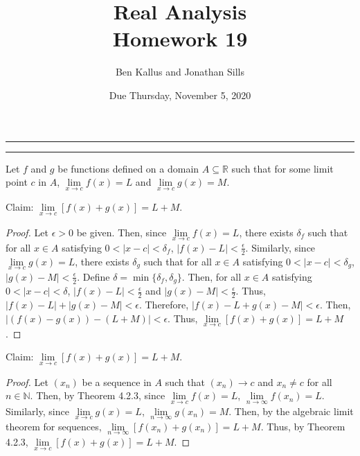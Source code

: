 \documentclass[12pt]{article}
\title{Real Analysis \\ Homework 19}
\author{Ben Kallus and Jonathan Sills}
\date{Due Thursday, November 5, 2020}
\begin{document}
\pagecolor{black}
\color{white}
\maketitle

\hrule
\bigskip


\bigskip
\hrule
\bigskip

 Let $f$ and $g$ be functions defined on a domain $A \subseteq \mathbb R$ such that for some limit point $c$ in $A$, $\lim\limits_{x\to c}f(x)=L$ and $\lim\limits_{x\to c}g(x) = M$.

\medskip
{} Claim: $\lim\limits_{x \to c}[f(x) + g(x)] = L + M$.
\begin{proof}
    Let $\epsilon > 0$ be given.
    Then, since $\lim\limits_{x\to c}f(x)=L$, there exists $\delta_f$ such that for all $x \in A$ satisfying $0 < |x - c| < \delta_f$, $|f(x) - L| < \frac\epsilon2$.
    Similarly, since $\lim\limits_{x\to c}g(x)=L$, there exists $\delta_g$ such that  for all $x \in A$ satisfying $0 < |x - c| < \delta_g$, $|g(x) - M| < \frac\epsilon2$.
    Define $\delta = \min\{\delta_f, \delta_g\}$.
    Then, for all $x \in A$ satisfying $0 < |x - c| < \delta$, $|f(x) - L| < \frac\epsilon2$ and $|g(x) - M| < \frac\epsilon2$.
    Thus, $|f(x) - L| + |g(x) - M| < \epsilon$.
    Therefore, $|f(x) - L + g(x) - M| < \epsilon$.
    Then, $|(f(x) - g(x)) - (L + M)| < \epsilon$.
    Thus, $\lim\limits_{x \to c}[f(x) + g(x)] = L + M$.
\end{proof}

\medskip
{} Claim: $\lim\limits_{x \to c}[f(x) + g(x)] = L + M$.
\begin{proof}
    Let $(x_n)$ be a sequence in $A$ such that $(x_n) \to c$ and $x_n \neq c$ for all $n \in \mathbb N$.
    Then, by Theorem 4.2.3, since $\lim\limits_{x\to c}f(x)=L$, $\lim\limits_{n\to \infty}f(x_n) = L$.
    Similarly, since $\lim\limits_{x\to c}g(x)=L$, $\lim\limits_{n\to \infty}g(x_n) = M$.
    Then, by the algebraic limit theorem for sequences, $\lim\limits_{n\to \infty}[f(x_n) + g(x_n)] = L + M$.
    Thus, by Theorem 4.2.3, $\lim\limits_{x \to c}[f(x) + g(x)] = L + M$.
\end{proof}
\end{document}
